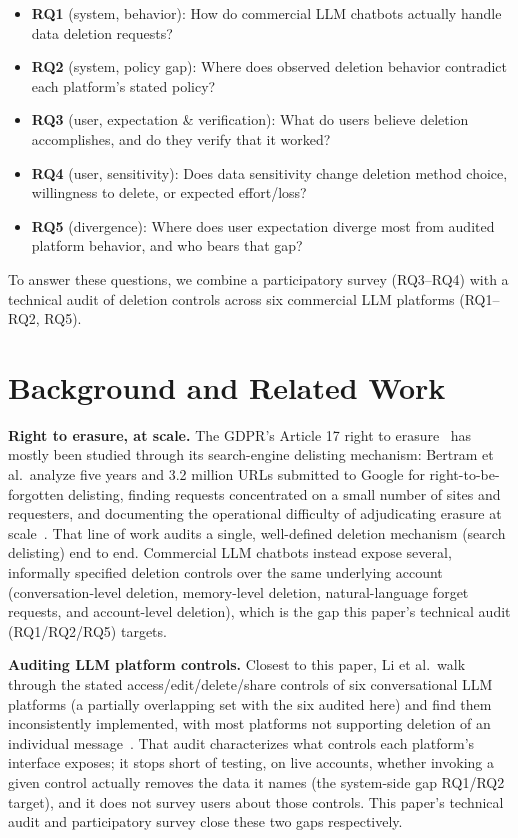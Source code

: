\documentclass[conference,compsoc]{IEEEtran}
\begin{document}
\begin{itemize}[leftmargin=*]
\item[] \textbf{RQ1} (system, behavior): How do commercial LLM chatbots
actually handle data deletion requests?
\item[] \textbf{RQ2} (system, policy gap): Where does observed deletion
behavior contradict each platform's stated policy?
\item[] \textbf{RQ3} (user, expectation & verification): What do users
believe deletion accomplishes, and do they verify that it worked?
\item[] \textbf{RQ4} (user, sensitivity): Does data sensitivity change
deletion method choice, willingness to delete, or expected effort/loss?
\item[] \textbf{RQ5} (divergence): Where does user expectation diverge
most from audited platform behavior, and who bears that gap?
\end{itemize}

To answer these questions, we combine a participatory survey
(RQ3--RQ4) with a technical audit of deletion controls across six
commercial LLM platforms (RQ1--RQ2, RQ5).


\section{Background and Related Work}
\label{sec:background}

\textbf{Right to erasure, at scale.} The GDPR's Article 17 right to
erasure~\cite{gdpr2016} has mostly been studied through its search-engine
delisting mechanism: Bertram et al.\ analyze five years and 3.2 million
URLs submitted to Google for right-to-be-forgotten delisting, finding
requests concentrated on a small number of sites and requesters, and
documenting the operational difficulty of adjudicating erasure at
scale~\cite{bertram2019five}. That line of work audits a single,
well-defined deletion mechanism (search delisting) end to end. Commercial
LLM chatbots instead expose several, informally specified deletion
controls over the same underlying account (conversation-level deletion,
memory-level deletion, natural-language forget requests, and
account-level deletion), which is the gap this paper's technical audit
(RQ1/RQ2/RQ5) targets.

\textbf{Auditing LLM platform controls.} Closest to this paper, Li et
al.\ walk through the stated access/edit/delete/share
controls of six conversational LLM platforms (a partially overlapping
set with the six audited here) and find them inconsistently
implemented, with most platforms not supporting deletion of an individual
message~\cite{li2026privacy}. That audit characterizes what controls each
platform's interface exposes; it stops short of testing, on live
accounts, whether invoking a given control actually removes the data it
names (the system-side gap RQ1/RQ2 target), and it does not survey users
about those controls. This paper's technical audit and participatory
survey close these two gaps respectively.
\end{document}

